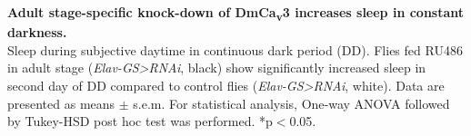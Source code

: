 \label{fig:S}
\textbf{Adult stage-specific knock-down of DmCa\textsubscript{v}3 increases sleep in constant darkness.}
\\
Sleep during subjective daytime in continuous dark period (DD). 
Flies fed RU486 in adult stage (\emph{Elav-GS\textgreater{}RNAi}, black) show significantly increased sleep in second day of DD compared to control flies (\emph{Elav-GS\textgreater{}RNAi}, white).
Data are presented as means $\pm$ s.e.m.
For statistical analysis, One-way ANOVA followed by Tukey-HSD post hoc test was performed.
*p$<$0.05.
